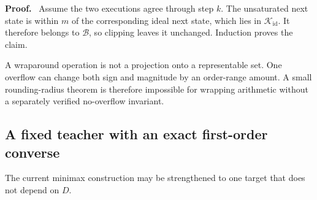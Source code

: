 \documentclass[twoside,11pt]{article}
\renewenvironment{proof}[1][Proof]{\par\noindent\textbf{#1.}\ }{\hfill\BlackBox\par\medskip}
\begin{document}

\begin{proof}
Assume the two executions agree through step $k$.  The unsaturated next state
is within $m$ of the corresponding ideal next state, which lies in
$\mathcal K_{\mathrm{id}}$.  It therefore belongs to $\mathcal B$, so
clipping leaves it unchanged.  Induction proves the claim.
\end{proof}

\begin{remark}
A wraparound operation is not a projection onto a representable set.  One
overflow can change both sign and magnitude by an order-range amount.  A small
rounding-radius theorem is therefore impossible for wrapping arithmetic
without a separately verified no-overflow invariant.
\end{remark}

\subsection{A fixed teacher with an exact first-order converse}
\label{sec:fixed-target-converse-candidate}

The current minimax construction may be strengthened to one target that does
not depend on $D$.
\end{document}
